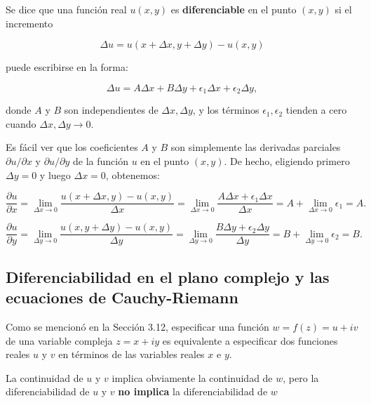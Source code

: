 \documentclass[10pt,a4paper]{book}
\begin{document}
Se dice que una funci\'on real $ u(x, y) $ es \textbf{diferenciable} en el punto $ (x, y) $ si el incremento  

\begin{equation}
    \Delta u = u(x + \Delta x, y + \Delta y) - u(x, y)
\end{equation}

puede escribirse en la forma:

\begin{equation}
    \Delta u = A \Delta x + B \Delta y + \epsilon_1 \Delta x + \epsilon_2 \Delta y,
\end{equation}

donde $ A $ y $ B $ son independientes de $ \Delta x, \Delta y $, y los t\'erminos $ \epsilon_1, \epsilon_2 $ tienden a cero cuando $ \Delta x, \Delta y \to 0 $.  

Es f\'acil ver que los coeficientes $ A $ y $ B $ son simplemente las derivadas parciales $ \partial u / \partial x $ y $ \partial u / \partial y $ de la funci\'on $ u $ en el punto $ (x, y) $. De hecho, eligiendo primero $ \Delta y = 0 $ y luego $ \Delta x = 0 $, obtenemos:

\begin{equation}
    \frac{\partial u}{\partial x} = \lim_{\Delta x \to 0} \frac{u(x + \Delta x, y) - u(x, y)}{\Delta x} = \lim_{\Delta x \to 0} \frac{A \Delta x + \epsilon_1 \Delta x}{\Delta x} = A + \lim_{\Delta x \to 0} \epsilon_1 = A.
\end{equation}

\begin{equation}
    \frac{\partial u}{\partial y} = \lim_{\Delta y \to 0} \frac{u(x, y + \Delta y) - u(x, y)}{\Delta y} = \lim_{\Delta y \to 0} \frac{B \Delta y + \epsilon_2 \Delta y}{\Delta y} = B + \lim_{\Delta y \to 0} \epsilon_2 = B.
\end{equation}

\subsection{Diferenciabilidad en el plano complejo y las ecuaciones de Cauchy-Riemann}

Como se mencion\'o en la Secci\'on 3.12, especificar una funci\'on $ w = f(z) = u + iv $ de una variable compleja $ z = x + iy $ es equivalente a especificar dos funciones reales $ u $ y $ v $ en t\'erminos de las variables reales $ x $ e $ y $.  

La continuidad de $ u $ y $ v $ implica obviamente la continuidad de $ w $, pero la diferenciabilidad de $ u $ y $ v $ \textbf{no implica} la diferenciabilidad de $ w $
\end{document}
